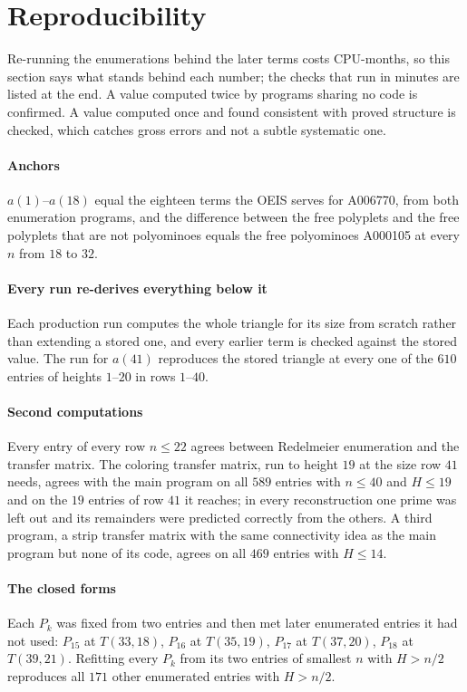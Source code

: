 \documentclass[11pt]{article}
\begin{document}
\section{Reproducibility}
\label{sec:reproduce}

Re-running the enumerations behind the later terms costs CPU-months, so this
section says what stands behind each number; the checks that run in minutes
are listed at the end. A value computed twice by programs sharing no code is
confirmed. A value computed once and found consistent with proved structure
is checked, which catches gross errors and not a subtle systematic one.

\paragraph{Anchors} $a(1)$--$a(18)$ equal the eighteen terms the OEIS serves
for A006770, from both enumeration programs, and the difference between the
free polyplets and the free polyplets that are not polyominoes equals the
free polyominoes A000105 at every $n$ from $18$ to $32$.

\paragraph{Every run re-derives everything below it} Each production run
computes the whole triangle for its size from scratch rather than extending a
stored one, and every earlier term is checked against the stored value. The
run for $a(41)$ reproduces the stored triangle at every one of the $610$
entries of heights $1$--$20$ in rows $1$--$40$.

\paragraph{Second computations} Every entry of every row $n \le 22$ agrees
between Redelmeier enumeration and the transfer matrix. The coloring transfer
matrix, run to height $19$ at the size row $41$ needs, agrees with the main
program on all $589$ entries with $n \le 40$ and $H \le 19$ and on the $19$
entries of row $41$ it reaches; in every reconstruction one prime was left
out and its remainders were predicted correctly from the others. A
third program, a strip transfer matrix with the same connectivity idea as the
main program but none of its code, agrees on all $469$ entries with $H \le 14$.

\paragraph{The closed forms} Each $P_k$ was fixed from two entries and then met
later enumerated entries it had not used: $P_{15}$ at $T(33,18)$, $P_{16}$ at
$T(35,19)$, $P_{17}$ at $T(37,20)$, $P_{18}$ at $T(39,21)$. Refitting every
$P_k$ from its two entries of smallest $n$ with $H > n/2$ reproduces all $171$
other enumerated entries with $H > n/2$.
\end{document}
